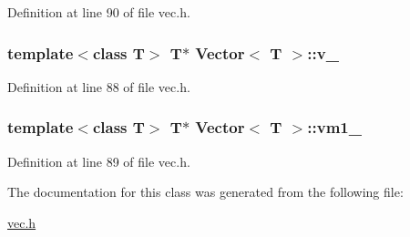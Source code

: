Definition at line 90 of file vec.\+h.

\hypertarget{class_vector_a35e75689eb9e46f564a5eaf515c73b72}{
\subsubsection[{v\+\_\+}]{\setlength{\rightskip}{0pt plus 5cm}template$<$class T$>$ T$\ast$ {\bf Vector}$<$ T $>$\+::v\+\_\+\hspace{0.3cm}{\ttfamily [protected]}}}\label{class_vector_a35e75689eb9e46f564a5eaf515c73b72}


Definition at line 88 of file vec.\+h.

\hypertarget{class_vector_a5fe8f82950fdae7d3a8f2405e66bbbbc}{
\subsubsection[{vm1\+\_\+}]{\setlength{\rightskip}{0pt plus 5cm}template$<$class T$>$ T$\ast$ {\bf Vector}$<$ T $>$\+::vm1\+\_\+\hspace{0.3cm}{\ttfamily [protected]}}}\label{class_vector_a5fe8f82950fdae7d3a8f2405e66bbbbc}


Definition at line 89 of file vec.\+h.



The documentation for this class was generated from the following file\+:\begin{DoxyCompactItemize}
\item 
\hyperlink{vec_8h}{vec.\+h}\end{DoxyCompactItemize}

